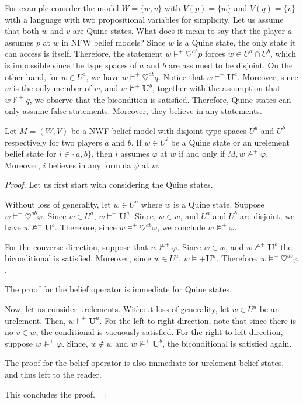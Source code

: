 \documentclass{article}
\begin{document}
For example consider the model $W = \{ w, v\}$ with $V(p) = \{ w \}$ and $V(q) = \{ v \}$ with a language with two propositional variables for simplicity. Let us assume that both $w$ and $v$ are Quine states. What does it mean to say that the player $a$ assumes $p$ at $w$ in NFW belief models? Since $w$ is a Quine state, the only state it can access is itself. Therefore, the statement $w \models^+ \heartsuit^{ab} p$ forces $w \in U^a \cap U^b$, which is impossible since the type spaces of $a$ and $b$ are assumed to be disjoint. On the other hand, for $w \in U^a$, we have $w \models^+ \heartsuit^{ab} q$. Notice that $w \models^+ \mathbf{U}^a$. Moreover, since $w$ is the only member of $w$, and $w \not\models^+ \mathbf{U}^b$, together with the assumption that $w \not\models^+ q$, we observe that the bicondition is satisfied. Therefore, Quine states can only assume false statements. Moreover, they believe in any statements.

\begin{thm}
Let $M = (W, V)$ be a NWF belief model with disjoint type spaces $U^a$ and $U^b$ respectively for two players $a$ and $b$. If $w \in U^i$ be a Quine state or an urelement belief state for $i \in \{a,b\}$, then $i$ assumes $\varphi$ at $w$ if and only if $M, w \not\models^+ \varphi$. Moreover, $i$ believes in any formula $\psi$ at $w$.
\end{thm}

\begin{proof}
Let us first start with considering the Quine states. 

Without loss of generality, let $w \in U^a$ where $w$ is a Quine state. Suppose $w \models^+ \heartsuit^{ab} \varphi$. Since $w \in U^a$, $w \models^+ \mathbf{U}^a$. Since, $w \in w$, and $U^a$ and $U^b$ are disjoint, we have $w \not\models^+ \mathbf{U}^b$. Therefore, since  $w \models^+ \heartsuit^{ab} \varphi$, we conclude $w \not\models^+ \varphi$.

For the converse direction, suppose that $w \not\models^+ \varphi$. Since $w \in w$, and $w \not\models^+ \mathbf{U}^b$ the biconditional is satisfied. Moreover, since $w \in U^a$, $w \models+ \mathbf{U}^a$. Therefore, $w \models^+ \heartsuit^{ab} \varphi$.

The proof for the belief operator is immediate for Quine states.

Now, let us consider urelements. Without loss of generality, let $w \in U^a$ be an urelement. Then, $w \models^+ \mathbf{U}^a$. For the left-to-right direction, note that since there is no $v \in w$, the conditional is vacuously satisfied. For the right-to-left direction, suppose $w \not\models^+ \varphi$. Since, $w \notin w$ and $w \not\models^+ \mathbf{U}^b$, the biconditional is satisfied again.

The proof for the belief operator is also immediate for urelement belief states, and thus left to the reader.

This concludes the proof.
\end{proof}
\end{document}
